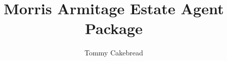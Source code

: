 \documentclass{report}
\begin{document}
\title{Morris Armitage Estate Agent Package}
\author{Tommy Cakebread}
\maketitle
\tableofcontents






\end{document}

